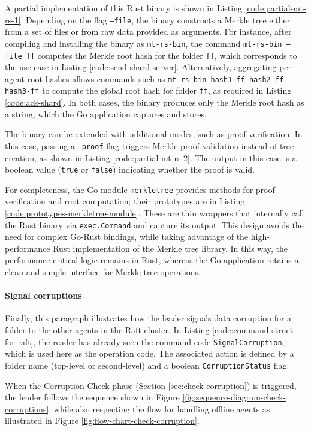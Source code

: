 A partial implementation of this Rust binary is shown in Listing
\ref{code:partial-mt-rs-1}. Depending on the flag \texttt{--file}, the binary constructs a 
Merkle tree either from a set of files or from raw data provided as arguments. For instance, 
after compiling and installing the binary as \texttt{mt-rs-bin}, the command 
\texttt{mt-rs-bin --file ff} computes the Merkle root hash for the folder \texttt{ff}, 
which corresponds to the use case in Listing \ref{code:send-shard-server}. Alternatively, 
aggregating per-agent root hashes allows commands such as 
\texttt{mt-rs-bin hash1-ff hash2-ff hash3-ff} to compute the global root hash for folder 
\texttt{ff}, as required in Listing \ref{code:ack-shard}. In both cases, the binary 
produces only the Merkle root hash as a string, which the Go application captures and stores.  

The binary can be extended with additional modes, such as proof verification. 
In this case, passing a \texttt{--proof} flag triggers Merkle proof validation instead of 
tree creation, as shown in Listing \ref{code:partial-mt-rs-2}. The output in this case is 
a boolean value (\texttt{true} or \texttt{false}) indicating whether the proof is valid.  

For completeness, the Go module \texttt{merkletree} provides methods for 
proof verification and root computation; their prototypes are in Listing \ref{code:prototypes-merkletree-module}. 
These are thin wrappers that internally call the Rust binary via 
\texttt{exec.Command} and capture its output. This design avoids the need for 
complex Go-Rust bindings, while taking advantage of the high-performance Rust 
implementation of the Merkle tree library. In this way, the performance-critical 
logic remains in Rust, whereas the Go application retains a clean and simple 
interface for Merkle tree operations.  

\paragraph{Signal corruptions}
Finally, this paragraph illustrates how the leader signals data corruption for a folder
to the other agents in the Raft cluster. In Listing
\ref{code:command-struct-for-raft}, the reader has already seen the command code
\texttt{SignalCorruption}, which is used here as the operation code. The
associated action is defined by a folder name (top-level or second-level) and a
boolean \texttt{CorruptionStatus} flag.

When the Corruption Check phase (Section \ref{sec:check-corruption}) is triggered,
the leader follows the sequence shown in Figure
\ref{fig:sequence-diagram-check-corruptions}, while also respecting the flow for
handling offline agents as illustrated in Figure
\ref{fig:flow-chart-check-corruption}.

